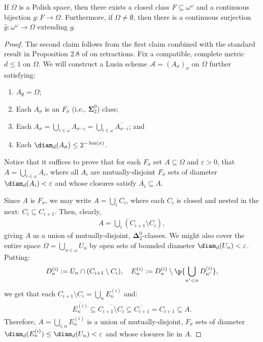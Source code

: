 \begin{theorem}
    \label{theorem:Polish_space_as_continuous_image_of_Baire}
    If $\Omega$ is a Polish space, then there exists a closed class $F \subseteq \omega^\omega$ and a continuous bijection $g: F \to \Omega$. Furthermore, if $\Omega \neq \emptyset$, then there is a continuous surjection $\hat{g}: \omega^\omega \to \Omega$ extending $g$.
\end{theorem}
\begin{proof}
    The second claim follows from the first claim combined with the standard result in Proposition 2.8 of \cite{Kec95} on retractions. Fix a compatible, complete metric $d \leq 1$ on $\Omega$. We will construct a Lusin scheme $\mathcal{A} = (A_\sigma)_\sigma$ on $\Omega$ further satisfying:
    \begin{enumerate}[label=(\roman*)]
        \item $A_\emptyset = \Omega$;
        \item Each $A_\sigma$ is an $F_\sigma$ (i.e., $\mathbf{\Sigma}^0_2$) class;
        \item Each $A_\sigma = \bigcup_{i \in \omega} A_{\sigma ^\frown i} = \bigcup_{i \in \omega} \overline{A_{\sigma ^\frown i}}$; and
        \item Each $\diam_d(A_\sigma) \leq 2^{- \operatorname{len}(\sigma)}$.
    \end{enumerate}
    Notice that it suffices to prove that for each $F_\sigma$ set $A \subseteq \Omega$ and $\varepsilon > 0$, that $A = \bigcup_{i \in \omega} A_i$,
    where all $A_i$ are mutually-disjoint $F_\sigma$ sets of diameter $\diam_d(A_i) < \varepsilon$ and whose closures satisfy $\overline{A_i} \subseteq A$. 
    
    Since $A$ is $F_\sigma$, we may write $A = \bigcup_i C_i$, where each $C_i$ is closed and nested in the next: $C_i \subseteq C_{i + 1}$. Then, clearly, 
    \begin{align*}
        A = \bigcup_i (C_{i + 1} \setminus C_i),
    \end{align*}
    giving $A$ as a union of mutually-disjoint, $\mathbf{\Delta}^0_2$-classes. We might also cover the entire space $\Omega = \bigcup_{n \in \omega} U_n$ by open sets of bounded diameter $\diam_d(U_n) < \varepsilon$. Putting:
    \begin{align*}
        D^{(i)}_n := U_n \cap (C_{i + 1} \setminus C_i), \quad E^{(i)}_n := D^{(i)}_n \setminus \p{\bigcup_{n' < n} D_{n'}^{(i)}},
    \end{align*}
    we get that each $C_{i + 1} \setminus C_i = \bigcup_n E^{(i)}_n$ and:
    \begin{align*}
        \overline{E^{(i)}_n} \subseteq \overline{C_{i + 1} \setminus C_i} \subseteq \overline{C_{i + 1}} = C_{i + 1} \subseteq A.
    \end{align*}
    Therefore, $A = \bigcup_{i, n} E^{(i)}_n$ is a union of mutually-disjoint, $F_\sigma$ sets of diameter $\diam_d(E^{(i)}_n) \leq \diam_d(U_n) < \varepsilon$ and whose closures lie in $A$.


\end{proof}
